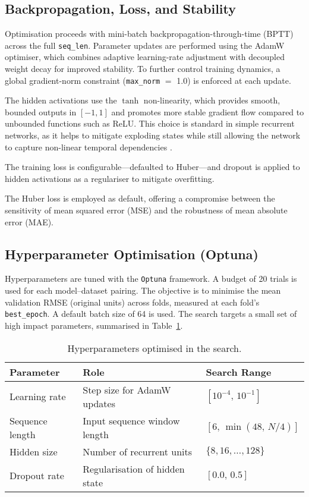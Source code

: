 \documentclass[conference]{IEEEtran}
\begin{document}
\subsection{\textbf{Backpropagation, Loss, and Stability}}

\noindent Optimisation proceeds with mini-batch backpropagation-through-time (BPTT) across the full \texttt{seq\_len}. Parameter updates are performed using the AdamW optimiser, which combines adaptive learning-rate adjustment with decoupled weight decay for improved stability. To further control training dynamics, a global gradient-norm constraint (\texttt{max\_norm} $=$ 1.0) is enforced at each update. 

The hidden activations use the $\tanh$ non-linearity, which provides smooth, bounded outputs in $[-1,1]$ and promotes more stable gradient flow compared to unbounded functions such as ReLU. This choice is standard in simple recurrent networks, as it helps to mitigate exploding states while still allowing the network to capture non-linear temporal dependencies \cite{goodfellow2016deep, pascanu2013difficulty}.

The training loss is configurable—defaulted to Huber—and dropout is applied to hidden activations as a regulariser to mitigate overfitting.

The Huber loss is employed as default, offering a compromise between the sensitivity of mean squared error (MSE) and the robustness of mean absolute error (MAE). \cite{huber1964robust}

\subsection{\textbf{Hyperparameter Optimisation (Optuna)}}                      

\noindent Hyperparameters are tuned with the \texttt{Optuna} framework. A budget of 20 trials is used for each model–dataset pairing. The objective is to minimise the mean validation RMSE (original units) across folds, measured at each fold’s \texttt{best\_epoch}. A default batch size of 64 is used. The search targets a small set of high impact parameters, summarised in Table~\ref{tab:hpo_params}.

\begin{table}[h]
    \renewcommand{\arraystretch}{1.15} %
    \centering
    \caption{Hyperparameters optimised in the search.}
    \label{tab:hpo_params}
    \begin{tabular}{p{1.9cm}p{3.5cm}p{2.0cm}}
    \toprule
    \textbf{Parameter} & \textbf{Role} & \textbf{Search Range} \\
    \midrule
    Learning rate   & Step size for AdamW updates & $[10^{-4},\,10^{-1}]$ \\
    Sequence length & Input sequence window length & $[6,\,\min(48,\,N/4)]$ \\
    Hidden size     & Number of recurrent units    & $\{8,16,\dots,128\}$ \\
    Dropout rate    & Regularisation of hidden state & $[0.0,\,0.5]$ \\
    \bottomrule
    \end{tabular}
\end{table}
\end{document}
